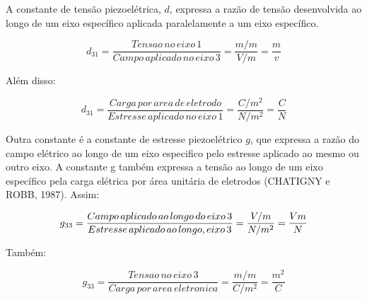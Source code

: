 \documentclass[
	12pt,				
	oneside,			
	a4paper,			
	english,			
	brazil,			
	]{abntex2ppgsi}
\begin{document}
A constante de tensão piezoelétrica, $d$, expressa a razão de tensão desenvolvida ao longo de um eixo específico aplicada paralelamente a um eixo específico. 

\begin{equation}
	d_{31} = \frac{Tensao \,no \,eixo \,1}{Campo \,aplicado \,no \,eixo \,3} = \frac{m/m}{V/m} = \frac{m}{v}
	\label{eq: Constante de Tensão Piezoelétrica}
\end{equation}



Além disso:

\begin{equation}
	d_{31} = \frac{Carga \,por \,area \,de \,eletrodo}{Estresse \,aplicado \,no \,eixo \,1} = \frac{C/m^{2}}{N/m^{2}} = \frac{C}{N}
	\label{eq: Boa pergunta}
\end{equation}


Outra constante é a constante de estresse piezoelétrico $g$, que expressa a razão do campo elétrico ao longo de um eixo especifico pelo estresse aplicado ao mesmo ou outro eixo. A constante g também expressa a tensão ao longo de um eixo específico pela carga elétrica por área unitária de eletrodos (CHATIGNY e ROBB, 1987). Assim:

\begin{equation}
	g_{33} = \frac{Campo \,aplicado \,ao \,longo \,do \,eixo \,3}{Estresse \,aplicado \,ao \,longo ,\do \,eixo \,3} = \frac{V/m}{N/m^{2}} = \frac{Vm}{N}
	\label{eq: Constante G, expressando a razão do campo elétrico ao longo do eixo.}
\end{equation}


Também:

\begin{equation}
	g_{33} = \frac{Tensao \,no \,eixo \,3}{Carga \,por \,area \,eletronica} = \frac{m/m}{C/m^{2}} = \frac{m^{2}}{C}
	\label{eq: Contante G, expressando a tensão ao longo de um eixo específico pela carga elétrica por área unitária de eletrodos.}
\end{equation}
\end{document}
